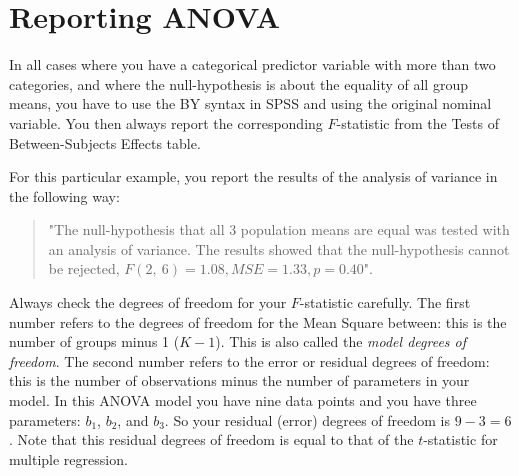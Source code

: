 \documentclass[]{book}\usepackage[]{graphicx}\usepackage[]{color}
\begin{document}
% 



\section{Reporting ANOVA}
In all cases where you have a categorical predictor variable with more than two categories, and where the null-hypothesis is about the equality of all group means, you have to use the BY syntax in SPSS and using the original nominal variable. You then always report the corresponding $F$-statistic from the Tests of Between-Subjects Effects table. 

For this particular example, you report the results of the analysis of variance in the following way:

\begin{quote}
"The null-hypothesis that all 3 population means are equal was tested with an analysis of variance. The results showed that the null-hypothesis cannot be rejected, $F(2,\ 6) = 1.08, MSE = 1.33, p = 0.40$".
\end{quote}

Always check the degrees of freedom for your $F$-statistic carefully. The first number refers to the degrees of freedom for the Mean Square between: this is the number of groups minus 1 ($K-1$). This is also called the \textit{model degrees of freedom}. The second number refers to the error or residual degrees of freedom: this is the number of observations minus the number of parameters in your model. In this ANOVA model you have nine data points and you have three parameters: $b_1$, $b_2$, and $b_3$. So your residual (error) degrees of freedom is $9-3=6$. Note that this residual degrees of freedom is equal to that of the $t$-statistic for multiple regression.
\end{document}
